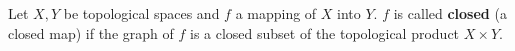 Let $X, Y$ be topological spaces and $f$ a mapping of $X$ into $Y$. $f$ is called \textbf{closed} (a closed map) if the graph of $f$ is a closed subset of the topological product $X \times Y$.
